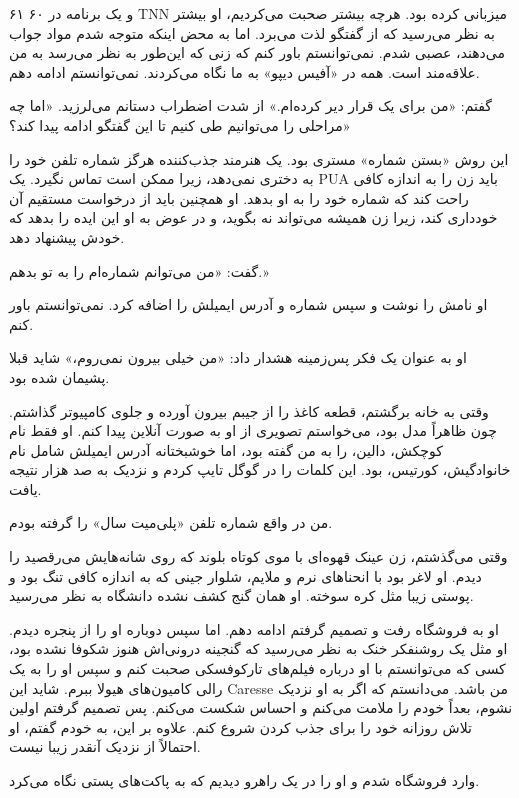۶۱ ۶۰ و یک برنامه در TNN میزبانی کرده بود. هرچه بیشتر صحبت می‌کردیم، او بیشتر به نظر می‌رسید که از گفتگو لذت می‌برد. اما به محض اینکه متوجه شدم مواد جواب می‌دهند، عصبی شدم. نمی‌توانستم باور کنم که زنی که این‌طور به نظر می‌رسد به من علاقه‌مند است. همه در «آفیس دیپو» به ما نگاه می‌کردند. نمی‌توانستم ادامه دهم. 

گفتم: «من برای یک قرار دیر کرده‌ام.» از شدت اضطراب دستانم می‌لرزید. «اما چه مراحلی را می‌توانیم طی کنیم تا این گفتگو ادامه پیدا کند؟» 

این روش «بستن شماره» مستری بود. یک هنرمند جذب‌کننده هرگز شماره تلفن خود را به دختری نمی‌دهد، زیرا ممکن است تماس نگیرد. یک PUA باید زن را به اندازه کافی راحت کند که شماره خود را به او بدهد. او همچنین باید از درخواست مستقیم آن خودداری کند، زیرا زن همیشه می‌تواند نه بگوید، و در عوض به او این ایده را بدهد که خودش پیشنهاد دهد. 

گفت: «من می‌توانم شماره‌ام را به تو بدهم.» 

او نامش را نوشت و سپس شماره و آدرس ایمیلش را اضافه کرد. نمی‌توانستم باور کنم. 

او به عنوان یک فکر پس‌زمینه هشدار داد: «من خیلی بیرون نمی‌روم،» شاید قبلا پشیمان شده بود. 

وقتی به خانه برگشتم، قطعه کاغذ را از جیبم بیرون آورده و جلوی کامپیوتر گذاشتم. چون ظاهراً مدل بود، می‌خواستم تصویری از او به صورت آنلاین پیدا کنم. او فقط نام کوچکش، دالین، را به من گفته بود، اما خوشبختانه آدرس ایمیلش شامل نام خانوادگیش، کورتیس، بود. این کلمات را در گوگل تایپ کردم و نزدیک به صد هزار نتیجه یافت. 

من در واقع شماره تلفن «پلی‌میت سال» را گرفته بودم. 

وقتی می‌گذشتم، زن عینک قهوه‌ای با موی کوتاه بلوند که روی شانه‌هایش می‌رقصید را دیدم. او لاغر بود با انحناهای نرم و ملایم، شلوار جینی که به اندازه کافی تنگ بود و پوستی زیبا مثل کره سوخته. او همان گنج کشف نشده دانشگاه به نظر می‌رسید. 

او به فروشگاه رفت و تصمیم گرفتم ادامه دهم. اما سپس دوباره او را از پنجره دیدم. او مثل یک روشنفکر خنک به نظر می‌رسید که گنجینه درونی‌اش هنوز شکوفا نشده بود، کسی که می‌توانستم با او درباره فیلم‌های تارکوفسکی صحبت کنم و سپس او را به یک رالی کامیون‌های هیولا ببرم. شاید این Caresse من باشد. می‌دانستم که اگر به او نزدیک نشوم، بعداً خودم را ملامت می‌کنم و احساس شکست می‌کنم. پس تصمیم گرفتم اولین تلاش روزانه خود را برای جذب کردن شروع کنم. علاوه بر این، به خودم گفتم، او احتمالاً از نزدیک آنقدر زیبا نیست. 

وارد فروشگاه شدم و او را در یک راهرو دیدیم که به پاکت‌های پستی نگاه می‌کرد. 

